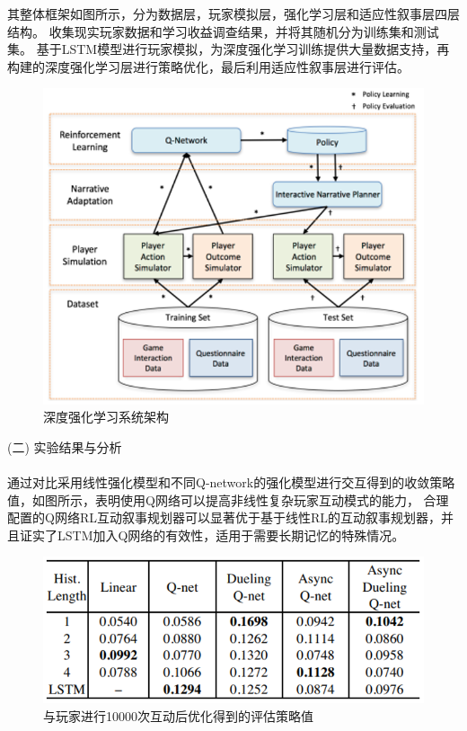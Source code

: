\documentclass{article}
\begin{document}
            其整体框架如图所示，分为数据层，玩家模拟层，强化学习层和适应性叙事层四层结构。
            收集现实玩家数据和学习收益调查结果，并将其随机分为训练集和测试集。
            基于LSTM模型进行玩家模拟，为深度强化学习训练提供大量数据支持，再构建的深度强化学习层进行策略优化，最后利用适应性叙事层进行评估。
            \begin{figure}[H]
            	
            	\centering
            	\includegraphics[scale=0.5]{images/RL_architecture.png}
            	\caption{深度强化学习系统架构}
            	\label{fig:label}
            \end{figure}

            (二) 实验结果与分析\paragraph{}
            通过对比采用线性强化模型和不同Q-network的强化模型进行交互得到的收敛策略值，如图所示，表明使用Q网络可以提高非线性复杂玩家互动模式的能力，
            合理配置的Q网络RL互动叙事规划器可以显著优于基于线性RL的互动叙事规划器，并且证实了LSTM加入Q网络的有效性，适用于需要长期记忆的特殊情况。
            \begin{figure}[H]
            	
            	\centering
            	\includegraphics[scale=0.6]{images/policy_value.png}
            	\caption{与玩家进行10000次互动后优化得到的评估策略值}
            	\label{fig:label}
            \end{figure}
\end{document}
